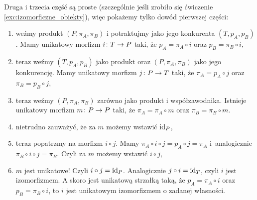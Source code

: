 \begin{prof}
  Druga i trzecia część są proste (szczególnie jeśli zrobiło się ćwiczenie \ref{exc:izomorficzne_obiekty}), więc pokażemy tylko dowód pierwszej części:
  \begin{enumerate}
    \item weźmy produkt $(P, \pi_A, \pi_B)$ i potraktujmy jako jego konkurenta $(T, p_A, p_B)$. Mamy unikatowy morfizm $i\colon T\to P$ taki, że $p_A = \pi_A\circ i$ oraz $p_B = \pi_B\circ i$,
    \begin{center}
    \end{center}
    \item teraz weźmy $(T, p_A, p_B)$ jako produkt oraz $(P, \pi_A, \pi_B)$ jako jego konkurencję. Mamy unikatowy morfizm $j\colon P\to T$ taki, że $\pi_A = p_A\circ j$ oraz $\pi_B = p_B\circ j$,
    \begin{center}
    \end{center}
    \item teraz weźmy $(P, \pi_A, \pi_B)$ zarówno jako produkt i współzawodnika. Istnieje unikatowy morfizm $m\colon P\to P$ taki, że $\pi_A = \pi_A\circ m$ oraz $\pi_B=\pi_B\circ m$.
    \begin{center}
    \end{center}
    \item nietrudno zauważyć, że za $m$ możemy wstawić $\mathrm{id}_{P}$,
    \item teraz popatrzmy na morfizm $i\circ j$. Mamy $\pi_A \circ i\circ j = p_A\circ j = \pi_A$ i~analogicznie $\pi_B\circ i\circ j = \pi_B$. Czyli za $m$ możemy wstawić $i\circ j$,
    \item $m$ jest unikatowe! Czyli $i\circ j = \mathrm{id}_{P}$. Analogicznie $j\circ i=\mathrm{id}_{T}$, czyli $i$ jest izomorfizmem. A skoro jest unikatową strzałką taką, że $p_A=\pi_A\circ i$ oraz $p_B=\pi_B\circ i$, to $i$ jest unikatowym izomorfizmem o zadanej własności.
  \end{enumerate}
\end{prof}

